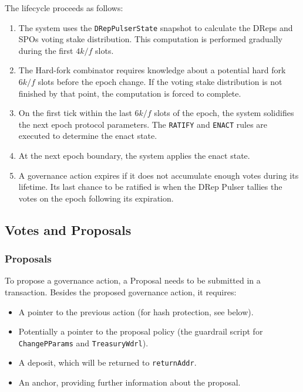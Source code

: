 The lifecycle proceeds as follows:

\begin{enumerate}
    \item The system uses the \texttt{DRepPulserState} snapshot to calculate the DReps and SPOs voting stake distribution. This computation is performed gradually during the first $4k/f$ slots.
    \item The Hard-fork combinator requires knowledge about a potential hard fork $6k/f$ slots before the epoch change. If the voting stake distribution is not finished by that point, the computation is forced to complete.
    \item On the first tick within the last $6k/f$ slots of the epoch, the system solidifies the next epoch protocol parameters. The \texttt{RATIFY} and \texttt{ENACT} rules are executed to determine the enact state.
    \item At the next epoch boundary, the system applies the enact state.
    \item A governance action expires if it does not accumulate enough votes during its lifetime. Its last chance to be ratified is when the DRep Pulser tallies the votes on the epoch following its expiration.
\end{enumerate}

\subsection{Votes and Proposals}

\subsubsection{Proposals}
To propose a governance action, a Proposal needs to be submitted in a transaction. Besides the proposed governance action, it requires:

\begin{itemize}
    \item A pointer to the previous action (for hash protection, see below).
    \item Potentially a pointer to the proposal policy (the guardrail script for \texttt{ChangePParams} and \texttt{TreasuryWdrl}).
    \item A deposit, which will be returned to \texttt{returnAddr}.
    \item An anchor, providing further information about the proposal.
\end{itemize}

